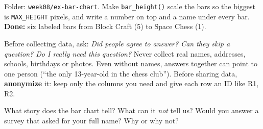 \begin{exercise}
Folder: \texttt{week08/ex-bar-chart}. Make \texttt{bar\_height()} scale the bars so the biggest is \texttt{MAX\_HEIGHT} pixels, and write a number on top and a name under every bar. \textbf{Done:} six labeled bars from Block Craft (5) to Space Chess (1).
\end{exercise}

\begin{safety}
Before collecting data, ask: \emph{Did people agree to answer? Can they skip a question? Do I really need this question?} Never collect real names, addresses, schools, birthdays or photos. Even without names, answers together can point to one person (\enquote{the only 13-year-old in the chess club}). Before sharing data, \textbf{anonymize} it: keep only the columns you need and give each row an ID like R1, R2.
\end{safety}

\begin{vocab}
\end{vocab}

\begin{reflection}
What story does the bar chart tell? What can it \emph{not} tell us?
Would you answer a survey that asked for your full name? Why or why not?
\end{reflection}
